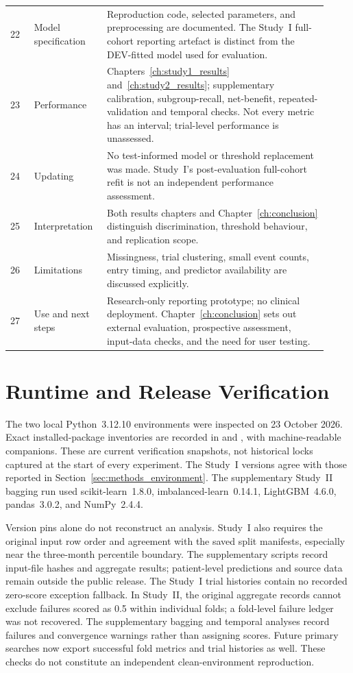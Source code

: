 \begin{longtable}{@{}p{0.07\linewidth}p{0.20\linewidth}p{0.65\linewidth}@{}}
22 & Model specification & Reproduction code, selected parameters, and preprocessing are documented. The Study~I full-cohort reporting artefact is distinct from the DEV-fitted model used for evaluation. \\
23 & Performance & Chapters~\ref{ch:study1_results} and~\ref{ch:study2_results}; supplementary calibration, subgroup-recall, net-benefit, repeated-validation and temporal checks. Not every metric has an interval; trial-level performance is unassessed. \\
24 & Updating & No test-informed model or threshold replacement was made. Study~I's post-evaluation full-cohort refit is not an independent performance assessment. \\
25 & Interpretation & Both results chapters and Chapter~\ref{ch:conclusion} distinguish discrimination, threshold behaviour, and replication scope. \\
26 & Limitations & Missingness, trial clustering, small event counts, entry timing, and predictor availability are discussed explicitly. \\
27 & Use and next steps & Research-only reporting prototype; no clinical deployment. Chapter~\ref{ch:conclusion} sets out external evaluation, prospective assessment, input-data checks, and the need for user testing. \\
\end{longtable}
\endgroup

\section{Runtime and Release Verification}
\label{app:runtime_verification}

The two local Python~3.12.10 environments were inspected on 23 October 2026. Exact installed-package inventories are recorded in  and , with machine-readable companions. These are current verification snapshots, not historical locks captured at the start of every experiment. The Study~I versions agree with those reported in Section~\ref{sec:methods_environment}. The supplementary Study~II bagging run used scikit-learn~1.8.0, imbalanced-learn~0.14.1, LightGBM~4.6.0, pandas~3.0.2, and NumPy~2.4.4.

Version pins alone do not reconstruct an analysis. Study~I also requires the original input row order and agreement with the saved split manifests, especially near the three-month percentile boundary. The supplementary scripts record input-file hashes and aggregate results; patient-level predictions and source data remain outside the public release. The Study~I trial histories contain no recorded zero-score exception fallback. In Study~II, the original aggregate records cannot exclude failures scored as 0.5 within individual folds; a fold-level failure ledger was not recovered. The supplementary bagging and temporal analyses record failures and convergence warnings rather than assigning scores. Future primary searches now export successful fold metrics and trial histories as well. These checks do not constitute an independent clean-environment reproduction.
